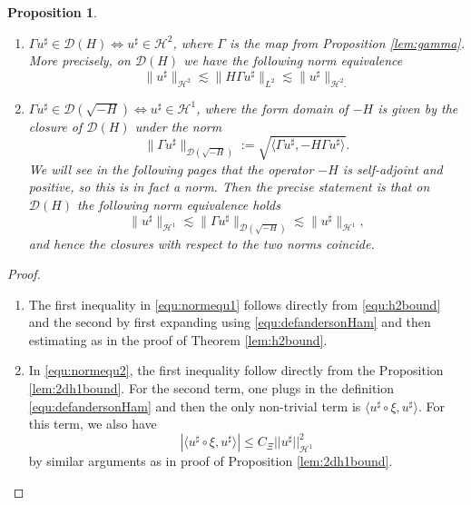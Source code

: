 \documentclass[11pt, oneside]{article}   	%
\newcommand{\assign}{:=}
\newcommand{\tmdummy}{$\mbox{}$}
\newenvironment{enumeratenumeric}{\begin{enumerate}[1.] }{\end{enumerate}}
\newtheorem{proposition}[theorem]{Proposition}
\newcommand{\ED}{\mathscr{D} ( \sqrt{-H})}
\newcommand{\ssp}{\mathscr{H}}
\begin{document}
\begin{proposition}
	\label{lem:formdom}{\tmdummy}
	
	\begin{enumeratenumeric}
		\item $\Gamma u^{\sharp} \in \mathscr{D} ({H})
		\Leftrightarrow u^{\sharp} \in \ssp^2$,
		where $\Gamma$ is the map from Proposition \ref{lem:gamma}.
		More precisely, on $\mathscr{D}(H)$ we have the following norm equivalence
		\begin{equation} \label{equ:normequ1}
		\| u^{\sharp} \|_{\ssp^2} \lesssim \| {H} \Gamma u^{\sharp} \|_{L^2}
		\lesssim \| u^{\sharp} \|_{\ssp^2 .} \end{equation}
		\item $\Gamma u^{\sharp} \in \mathscr{D} ( \sqrt{-
			{H}}) \Leftrightarrow u^{\sharp} \in \ssp^1$,
		where the form domain of $- {H}$ is given by the closure of
		$\mathscr{D} ({H})$ under the norm
		\begin{equation} \label{equ:normequ2}
		\| \Gamma u^{\sharp} \|_{\ED} \assign
		\sqrt{ \langle \Gamma u^{\sharp}, -{H} \Gamma u^{\sharp} \rangle}
		. \end{equation}
		We will see in the following pages that the operator $-H$ is self-adjoint and positive, so this is in fact a norm.
		Then the precise statement is that on $\mathscr{D} ({H})$ the
		following norm equivalence holds
		\[ \| u^{\sharp} \|_{\ssp^1} \lesssim \| \Gamma u^{\sharp}
		\|_{\ED} \lesssim \| u^{\sharp} \|_{\ssp^1}, \]
		and hence the closures with respect to the two norms coincide.
	\end{enumeratenumeric}
\end{proposition}
\begin{proof}
	\begin{enumerate}
		\item  The first inequality in \eqref{equ:normequ1} follows directly from \eqref{equ:h2bound} and the second by first expanding using \eqref{equ:defandersonHam} and then estimating as in the proof of Theorem  \ref{lem:h2bound}.
	\item In \eqref{equ:normequ2}, the first inequality follow directly from the Proposition \ref{lem:2dh1bound}.  For the second term, one plugs in the definition \eqref{equ:defandersonHam} and then the only non-trivial term is $\langle u^\sharp \circ \xi, u^\sharp \rangle$.  For this term, we also have
	\[
	|\langle u^\sharp \circ \xi, u^\sharp \rangle| \leq C_{\Xi} ||u^\sharp||_{\mathscr{H}^{1}}^2
	\]
	by similar arguments as in proof of Proposition \ref{lem:2dh1bound}.  
\end{enumerate}
\end{proof}
\end{document}
